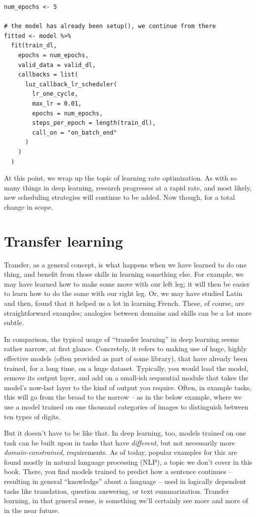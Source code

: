 \documentclass[
  letterpaper,
]{krantz}
\begin{document}
\begin{verbatim}
num_epochs <- 5 

# the model has already been setup(), we continue from there
fitted <- model %>%
  fit(train_dl,
    epochs = num_epochs,
    valid_data = valid_dl,
    callbacks = list(
      luz_callback_lr_scheduler(
        lr_one_cycle,
        max_lr = 0.01,
        epochs = num_epochs,
        steps_per_epoch = length(train_dl),
        call_on = "on_batch_end"
      )
    )
  )
\end{verbatim}

At this point, we wrap up the topic of learning rate optimization. As
with so many things in deep learning, research progresses at a rapid
rate, and most likely, new scheduling strategies will continue to be
added. Now though, for a total change in scope.

\hypertarget{transfer-learning}{%
\section{\texorpdfstring{Transfer
learning}{Transfer learning}}\label{transfer-learning}}

Transfer, as a general concept, is what happens when we have learned to
do one thing, and benefit from those skills in learning something else.
For example, we may have learned how to make some move with our left
leg; it will then be easier to learn how to do the same with our right
leg. Or, we may have studied Latin and then, found that it helped us a
lot in learning French. These, of course, are straightforward examples;
analogies between domains and skills can be a lot more subtle.

In comparison, the typical usage of ``transfer learning'' in deep
learning seems rather narrow, at first glance. Concretely, it refers to
making use of huge, highly effective models (often provided as part of
some library), that have already been trained, for a long time, on a
huge dataset. Typically, you would load the model, remove its output
layer, and add on a small-ish sequential module that takes the model's
now-last layer to the kind of output you require. Often, in example
tasks, this will go from the broad to the narrow -- as in the below
example, where we use a model trained on one thousand categories of
images to distinguish between ten types of digits.

But it doesn't have to be like that. In deep learning, too, models
trained on one task can be built upon in tasks that have
\emph{different}, but not necessarily more \emph{domain-constrained},
requirements. As of today, popular examples for this are found mostly in
natural language processing (NLP), a topic we don't cover in this book.
There, you find models trained to predict how a sentence continues --
resulting in general ``knowledge'' about a language -- used in logically
dependent tasks like translation, question answering, or text
summarization. Transfer learning, in that general sense, is something
we'll certainly see more and more of in the near future.
\end{document}
